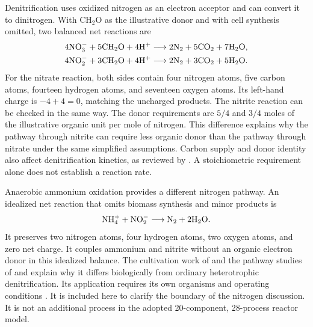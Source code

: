 Denitrification uses oxidized nitrogen as an electron acceptor and can convert it to dinitrogen. With $\mathrm{CH_2O}$ as the illustrative donor and with cell synthesis omitted, two balanced net reactions are
\begin{align}
\equationname{Idealized nitrate denitrification with an organic donor}
4\mathrm{NO_3^-}+5\mathrm{CH_2O}+4\mathrm{H^+}
&\longrightarrow2\mathrm{N_2}+5\mathrm{CO_2}+7\mathrm{H_2O},
\label{eq:teaching_nitrate_denitrification}\\
\equationname{Idealized nitrite denitrification with an organic donor}
4\mathrm{NO_2^-}+3\mathrm{CH_2O}+4\mathrm{H^+}
&\longrightarrow2\mathrm{N_2}+3\mathrm{CO_2}+5\mathrm{H_2O}.
\label{eq:teaching_nitrite_denitrification}
\end{align}
For the nitrate reaction, both sides contain four nitrogen atoms, five carbon atoms, fourteen hydrogen atoms, and seventeen oxygen atoms. Its left-hand charge is $-4+4=0$, matching the uncharged products. The nitrite reaction can be checked in the same way. The donor requirements are $5/4$ and $3/4$ moles of the illustrative organic unit per mole of nitrogen. This difference explains why the pathway through nitrite can require less organic donor than the pathway through nitrate under the same simplified assumptions. Carbon supply and donor identity also affect denitrification kinetics, as reviewed by \citet{Lu2014}. A stoichiometric requirement alone does not establish a reaction rate.

Anaerobic ammonium oxidation provides a different nitrogen pathway. An idealized net reaction that omits biomass synthesis and minor products is
\begin{equation}
\equationname{Idealized anaerobic ammonium oxidation reaction}
\mathrm{NH_4^+}+\mathrm{NO_2^-}
\longrightarrow\mathrm{N_2}+2\mathrm{H_2O}.
\label{eq:teaching_anammox}
\end{equation}
It preserves two nitrogen atoms, four hydrogen atoms, two oxygen atoms, and zero net charge. It couples ammonium and nitrite without an organic electron donor in this idealized balance. The cultivation work of \citet{Strous1998} and the pathway studies of \citet{Dietl2015} and \citet{Maalcke2016} explain why it differs biologically from ordinary heterotrophic denitrification. Its application requires its own organisms and operating conditions \citep{Vandekerckhove2018,Xie2021,WinklerStraka2019}. It is included here to clarify the boundary of the nitrogen discussion. It is not an additional process in the adopted 20-component, 28-process reactor model.

